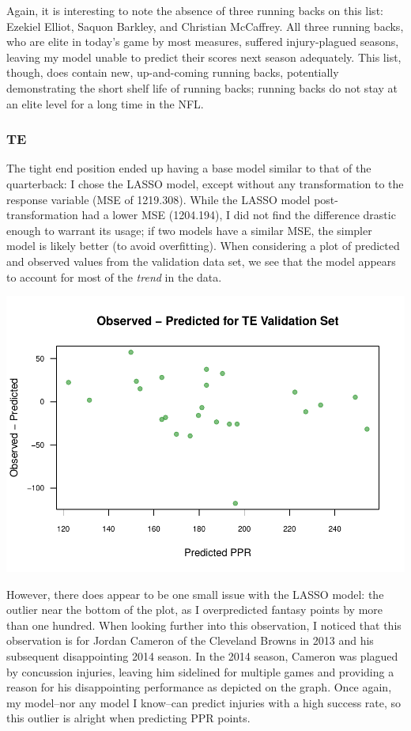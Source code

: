 \documentclass[
]{article}
\begin{document}
Again, it is interesting to note the absence of three running backs on
this list: Ezekiel Elliot, Saquon Barkley, and Christian McCaffrey. All
three running backs, who are elite in today's game by most measures,
suffered injury-plagued seasons, leaving my model unable to predict
their scores next season adequately. This list, though, does contain
new, up-and-coming running backs, potentially demonstrating the short
shelf life of running backs; running backs do not stay at an elite level
for a long time in the NFL.

\hypertarget{te}{%
\subsubsection{TE}\label{te}}

The tight end position ended up having a base model similar to that of
the quarterback: I chose the LASSO model, except without any
transformation to the response variable (MSE of 1219.308). While the
LASSO model post-transformation had a lower MSE (1204.194), I did not
find the difference drastic enough to warrant its usage; if two models
have a similar MSE, the simpler model is likely better (to avoid
overfitting). When considering a plot of predicted and observed values
from the validation data set, we see that the model appears to account
for most of the \emph{trend} in the data.

\begin{center}\includegraphics[width=0.85\linewidth]{stats_199_final_report_files/figure-latex/unnamed-chunk-10-1} \end{center}

However, there does appear to be one small issue with the LASSO model:
the outlier near the bottom of the plot, as I overpredicted fantasy
points by more than one hundred. When looking further into this
observation, I noticed that this observation is for Jordan Cameron of
the Cleveland Browns in 2013 and his subsequent disappointing 2014
season. In the 2014 season, Cameron was plagued by concussion injuries,
leaving him sidelined for multiple games and providing a reason for his
disappointing performance as depicted on the graph. Once again, my
model--nor any model I know--can predict injuries with a high success
rate, so this outlier is alright when predicting PPR points.
\end{document}
